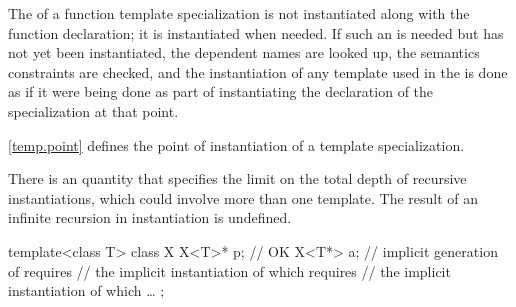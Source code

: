 \pnum
The  of a function template specialization
is not instantiated along with the function declaration; it is instantiated
when needed. If such an
 is needed but has not yet been
instantiated, the dependent names are looked up, the semantics constraints are
checked, and the instantiation of any template used in the
 is done as if it were being done as part
of instantiating the declaration of the specialization at that point.

\pnum
\begin{note}
\ref{temp.point} defines the point of instantiation of a template specialization.
\end{note}

\pnum
There is an  quantity
that specifies the limit on the total depth of recursive instantiations,
which could involve more than one template.
The result of an infinite recursion in instantiation is undefined.
\begin{example}
\begin{codeblock}
template<class T> class X {
  X<T>* p;          // OK
  X<T*> a;          // implicit generation of  requires
                    // the implicit instantiation of  which requires
                    // the implicit instantiation of  which \ldots
};
\end{codeblock}
\end{example}

